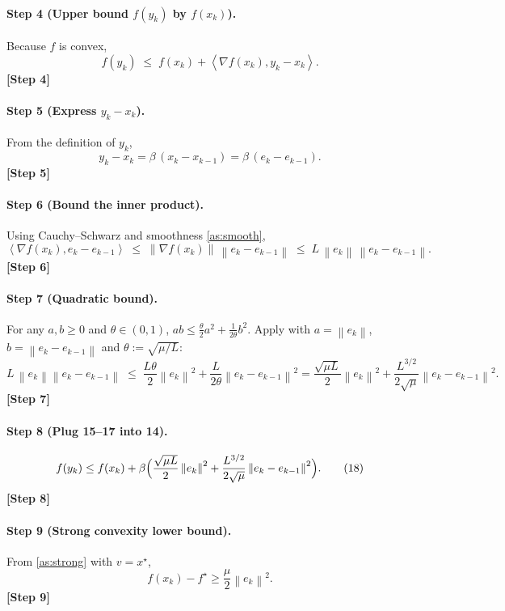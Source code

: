 \documentclass{article}
\newcommand{\norm}[1]{\left\lVert#1\right\rVert}
\newcommand{\inner}[2]{\left\langle #1,#2\right\rangle}
\begin{document}
\paragraph{Step 4 (Upper bound $f(y_{k})$ by $f(x_{k})$).}
Because $f$ is convex,
\[
f(y_{k})\;\le\; f(x_{k})+\inner{\nabla f(x_{k})}{y_{k}-x_{k}}.
\tag{14}
\]
\textbf{[Step 4]}

\paragraph{Step 5 (Express $y_{k}-x_{k}$).}
From the definition of $y_{k}$,
\[
y_{k}-x_{k}= \beta\,(x_{k}-x_{k-1}) =\beta\,(e_{k}-e_{k-1}).
\tag{15}
\]
\textbf{[Step 5]}

\paragraph{Step 6 (Bound the inner product).}
Using Cauchy–Schwarz and smoothness \eqref{as:smooth},
\[
\inner{\nabla f(x_{k})}{e_{k}-e_{k-1}}
\;\le\;
\norm{\nabla f(x_{k})}\,\norm{e_{k}-e_{k-1}}
\;\le\;
L\,\norm{e_{k}}\,\norm{e_{k}-e_{k-1}}.
\tag{16}
\]
\textbf{[Step 6]}

\paragraph{Step 7 (Quadratic bound).}
For any $a,b\ge0$ and $\theta\in(0,1)$,
$ab\le \frac{\theta}{2}a^{2}+\frac{1}{2\theta}b^{2}$.
Apply with $a=\norm{e_{k}}$, $b=\norm{e_{k}-e_{k-1}}$ and
$\theta:=\sqrt{\mu/L}$:
\[
L\,\norm{e_{k}}\norm{e_{k}-e_{k-1}}
\;\le\;
\frac{L\theta}{2}\norm{e_{k}}^{2}
+\frac{L}{2\theta}\norm{e_{k}-e_{k-1}}^{2}
=
\frac{\sqrt{\mu L}}{2}\norm{e_{k}}^{2}
+\frac{L^{3/2}}{2\sqrt{\mu}}\norm{e_{k}-e_{k-1}}^{2}.
\tag{17}
\]
\textbf{[Step 7]}

\paragraph{Step 8 (Plug 15–17 into 14).}
\[
f(y_{k})\le f(x_{k})+
\beta\Bigl(\frac{\sqrt{\mu L}}{2}\norm{e_{k}}^{2}
+\frac{L^{3/2}}{2\sqrt{\mu}}\norm{e_{k}-e_{k-1}}^{2}\Bigr).
\tag{18}
\]
\textbf{[Step 8]}

\paragraph{Step 9 (Strong convexity lower bound).}
From \eqref{as:strong} with $v=x^{\star}$,
\[
f(x_{k})-f^{\star}\ge \frac{\mu}{2}\norm{e_{k}}^{2}.
\tag{19}
\]
\textbf{[Step 9]}
\end{document}
